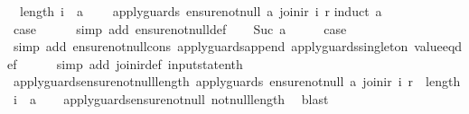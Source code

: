\begin{isabellebody}
\ \ {\isachardoublequoteopen}length\ i\ {\isasymge}\ a\ {\isasymLongrightarrow}\isanewline
\ \ \ apply{\isacharunderscore}guards\ {\isacharparenleft}ensure{\isacharunderscore}not{\isacharunderscore}null\ a{\isacharparenright}\ {\isacharparenleft}join{\isacharunderscore}ir\ i\ r{\isacharparenright}{\isachardoublequoteclose}\isanewline
%
\isadelimproof
%
\endisadelimproof
%
\isatagproof
{}\isamarkupfalse%
{\isacharparenleft}induct\ a{\isacharparenright}\isanewline
\ \ \isamarkupfalse%
\ {}\isanewline
\ \ \isamarkupfalse%
\ \isamarkupfalse%
\ {\isacharquery}case\isanewline
\ \ \ \ \isamarkupfalse%
\ {\isacharparenleft}simp\ add{\isacharcolon}\ ensure{\isacharunderscore}not{\isacharunderscore}null{\isacharunderscore}def{\isacharparenright}\isanewline
{}\isamarkupfalse%
\isanewline
\ \ \isamarkupfalse%
\ {\isacharparenleft}Suc\ a{\isacharparenright}\isanewline
\ \ \isamarkupfalse%
\ \isamarkupfalse%
\ {\isacharquery}case\isanewline
\ \ \ \ \isamarkupfalse%
\ {\isacharparenleft}simp\ add{\isacharcolon}\ ensure{\isacharunderscore}not{\isacharunderscore}null{\isacharunderscore}cons\ apply{\isacharunderscore}guards{\isacharunderscore}append\ apply{\isacharunderscore}guards{\isacharunderscore}singleton\ value{\isacharunderscore}eq{\isacharunderscore}def{\isacharparenright}\isanewline
\ \ \ \ \isamarkupfalse%
\ {\isacharparenleft}simp\ add{\isacharcolon}\ join{\isacharunderscore}ir{\isacharunderscore}def\ input{}state{\isacharunderscore}nth{\isacharparenright}\isanewline
{}\isamarkupfalse%
%
\endisatagproof
{\isafoldproof}%
%
\isadelimproof
\isanewline
%
\endisadelimproof
\isanewline
{}\isamarkupfalse%
\ apply{\isacharunderscore}guards{\isacharunderscore}ensure{\isacharunderscore}not{\isacharunderscore}null{\isacharunderscore}length{\isacharcolon}\ {\isachardoublequoteopen}apply{\isacharunderscore}guards\ {\isacharparenleft}ensure{\isacharunderscore}not{\isacharunderscore}null\ a{\isacharparenright}\ {\isacharparenleft}join{\isacharunderscore}ir\ i\ r{\isacharparenright}\ {\isacharequal}\ {\isacharparenleft}length\ i\ {\isasymge}\ a{\isacharparenright}{\isachardoublequoteclose}\isanewline
%
\isadelimproof
\ \ %
\endisadelimproof
%
\isatagproof
{}\isamarkupfalse%
\ apply{\isacharunderscore}guards{\isacharunderscore}ensure{\isacharunderscore}not{\isacharunderscore}null\ not{\isacharunderscore}null{\isacharunderscore}length\ \isamarkupfalse%
\ blast%
\endisatagproof
{\isafoldproof}%
%
\isadelimproof
\isanewline
%
\endisadelimproof
%
\isadelimtheory
\isanewline
%
\endisadelimtheory
%
\isatagtheory
{}\isamarkupfalse%
%
\endisatagtheory
{\isafoldtheory}%
%
\isadelimtheory
%
\endisadelimtheory
%
\end{isabellebody}%
